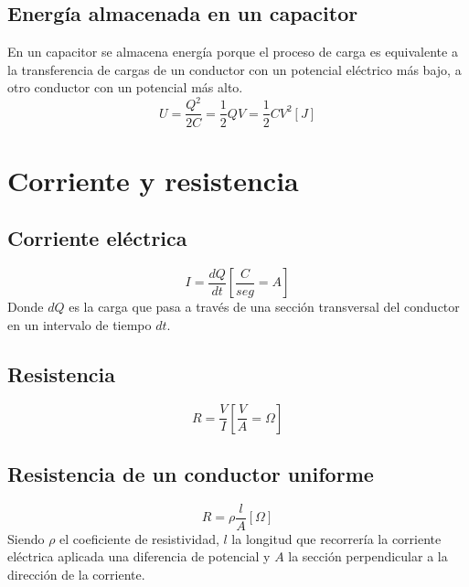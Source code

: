 \documentclass{report}
\begin{document}
    \subsection*{Energía almacenada en un capacitor}

      En un capacitor se almacena energía porque el proceso de carga es equivalente 
      a la transferencia de cargas de un conductor con un potencial eléctrico 
      más bajo, a otro conductor con un potencial más alto.
      \begin{equation*}
        U=\frac{Q^2}{2C}=\frac{1}{2}QV=\frac{1}{2}CV^2[J]
      \end{equation*}

  \section*{Corriente y resistencia}

    \subsection*{Corriente eléctrica}

      \begin{equation*}
        I=\frac{dQ}{dt}\left[\frac{C}{seg}=A\right]
      \end{equation*}
      Donde $dQ$ es la carga que pasa a través de una sección transversal del 
      conductor en un intervalo de tiempo $dt$.

    \subsection*{Resistencia}

      \begin{equation*}
        R=\frac{V}{I}\left[\frac{V}{A}=\Omega\right]
      \end{equation*}

    \subsection*{Resistencia de un conductor uniforme}

      \begin{equation*}
        R=\rho\frac{l}{A}[\Omega]
      \end{equation*}
      \indent Siendo $\rho$ el coeficiente de resistividad, $l$ la longitud que recorrería
      la corriente eléctrica aplicada una diferencia de potencial y $A$ la sección
      perpendicular a la dirección de la corriente.
\end{document}
